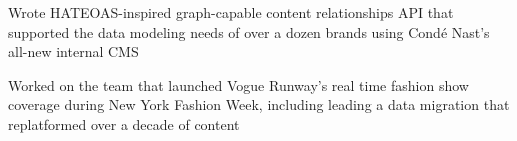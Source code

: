 \begin{job}

  \begin{accomplishments}
    \item Wrote HATEOAS-inspired graph-capable content relationships
    API that supported the data modeling needs of over a dozen brands using
    Cond\'{e} Nast's all-new internal CMS
    \item Worked on the team that launched Vogue Runway's real time fashion show
    coverage during New York Fashion Week, including leading a data migration
    that replatformed over a decade of content
  \end{accomplishments}
\end{job}
